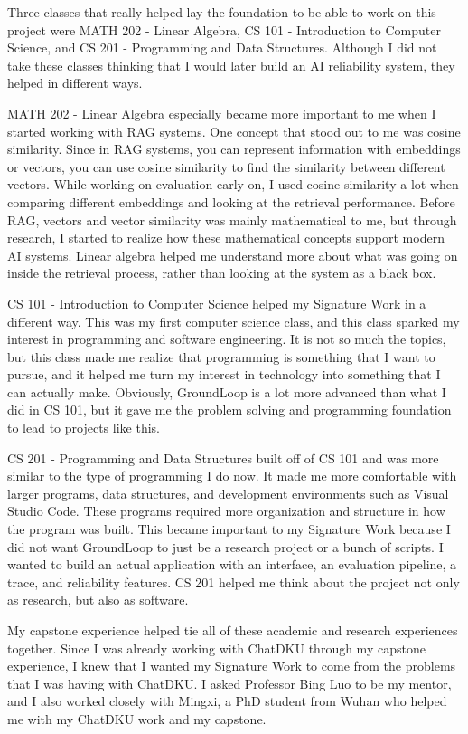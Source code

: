 \documentclass[12pt, a4paper, oneside]{report}
\begin{document}
Three classes that really helped lay the foundation to be able to work on this project were MATH 202 - Linear Algebra, CS 101 - Introduction to Computer Science, and CS 201 - Programming and Data Structures. Although I did not take these classes thinking that I would later build an AI reliability system, they helped in different ways.

MATH 202 - Linear Algebra especially became more important to me when I started working with RAG systems. One concept that stood out to me was cosine similarity. Since in RAG systems, you can represent information with embeddings or vectors, you can use cosine similarity to find the similarity between different vectors. While working on evaluation early on, I used cosine similarity a lot when comparing different embeddings and looking at the retrieval performance. Before RAG, vectors and vector similarity was mainly mathematical to me, but through research, I started to realize how these mathematical concepts support modern AI systems. Linear algebra helped me understand more about what was going on inside the retrieval process, rather than looking at the system as a black box.

CS 101 - Introduction to Computer Science helped my Signature Work in a different way. This was my first computer science class, and this class sparked my interest in programming and software engineering. It is not so much the topics, but this class made me realize that programming is something that I want to pursue, and it helped me turn my interest in technology into something that I can actually make. Obviously, GroundLoop is a lot more advanced than what I did in CS 101, but it gave me the problem solving and programming foundation to lead to projects like this.

CS 201 - Programming and Data Structures built off of CS 101 and was more similar to the type of programming I do now. It made me more comfortable with larger programs, data structures, and development environments such as Visual Studio Code. These programs required more organization and structure in how the program was built. This became important to my Signature Work because I did not want GroundLoop to just be a research project or a bunch of scripts. I wanted to build an actual application with an interface, an evaluation pipeline, a trace, and reliability features. CS 201 helped me think about the project not only as research, but also as software.

My capstone experience helped tie all of these academic and research experiences together. Since I was already working with ChatDKU through my capstone experience, I knew that I wanted my Signature Work to come from the problems that I was having with ChatDKU. I asked Professor Bing Luo to be my mentor, and I also worked closely with Mingxi, a PhD student from Wuhan who helped me with my ChatDKU work and my capstone.
\end{document}

